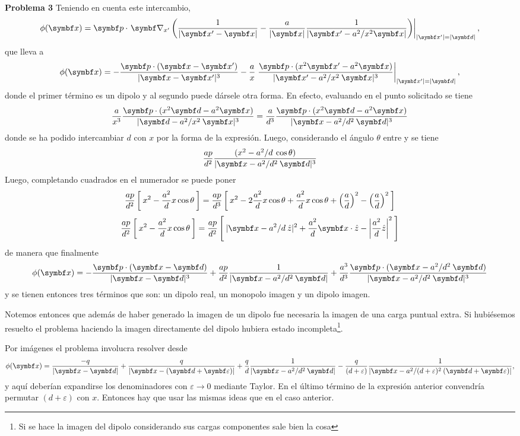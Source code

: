 \documentclass[10pt,oneside]{CBFT_book}
\begin{document}
\begin{ejemplo}{\bf Problema 3}
Teniendo en cuenta este intercambio,
\[
	\phi(\vbx) =  \vb{p} \cdot \left. \Nabla_{x'} \left( 
	\frac{1}{|\vbx'-\vbx|} - \frac{a}{|\vbx|}\frac{1}{|\vbx' - a^2/x^2 \vbx|}
	\right) \right|_{|\vbx'|=|\vb{d}|},
\]
que lleva a 
\[
	\phi(\vbx) = - \frac{\vb{p}\cdot(\vbx-\vbx')}{|\vbx-\vbx'|^3} 
	- \frac{a}{x} \left. \frac{ \vb{p} \cdot ( x^2 \vbx' - a^2 \vb{x} )}{|\vbx' - a^2/x^2 \: \vbx|^3}
	\right|_{|\vbx'|=|\vb{d}|},
\]
donde el primer término es un dipolo y al segundo puede dársele otra forma. En efecto, evaluando
en el punto solicitado se tiene
\[
	\frac{a}{x^3} \frac{ \vb{p} \cdot ( x^2 \vb{d} - a^2 \vb{x} )}{|\vb{d} - a^2/x^2 \: \vbx|^3} = 
	\frac{a}{d^3} \frac{ \vb{p} \cdot ( x^2 \vb{d} - a^2 \vb{x} )}{|\vbx - a^2/d^2 \: \vb{d}|^3}
\]
donde se ha podido intercambiar $d$ con $x$ por la forma de la expresión. Luego, considerando
el ángulo $\theta$ entre  y  se tiene
\[
	\frac{ap}{d^2} \frac{( x^2 - a^2 /d \: \cos\theta)}{|\vbx - a^2/d^2 \: \vb{d}|^3}
\]
Luego, completando cuadrados en el numerador se puede poner
\[
	\frac{ap}{d^2}\left[\: x^2 - \frac{a^2}{d} x \cos\theta \:\right] =
	\frac{ap}{d^3}\left[\: x^2 - 2 \frac{a^2}{d} x \cos\theta + \frac{a^2}{d} x \cos\theta 
	+ \left( \frac{ a }{ d } \right)^2 - \left( \frac{ a }{ d } \right)^2 \:\right]
\]
\[
	\frac{ap}{d^2}\left[\: x^2 - \frac{a^2}{d} x \cos\theta \:\right] =
	\frac{ap}{d^2}\left[\: |\vbx - a^2/d \: \hat{z}|^2 + \frac{a^2}{d}\vbx\cdot\hat{z} - 
	\left| \frac{a^2}{d} \hat{z} \right|^2 \:\right]
\]
de manera que finalmente
\[
	\phi(\vbx) =  - \frac{\vb{p}\cdot(\vbx-\vb{d})}{|\vbx-\vb{d}|^3} +
	\frac{ap}{d^2} \frac{1}{|\vbx - a^2/d^2 \: \vb{d}|}+
	\frac{a^3}{d^3} \frac{\vb{p}\cdot(\vbx- a^2/d^2 \: \vb{d})}{|\vbx - a^2/d^2 \: \vb{d}|^3}
\]
y se tienen entonces tres términos que son: un dipolo real, un monopolo imagen y un dipolo imagen.

Notemos entonces que además de haber generado la imagen de un dipolo fue necesaria la imagen de una carga
puntual extra. Si hubiésemos resuelto el problema haciendo la imagen directamente del dipolo hubiera
estado incompleta\footnote{Si se hace la imagen del dipolo considerando sus cargas componentes sale
bien la cosa}.

Por imágenes el problema involucra resolver desde
\[
	\phi(\vbx) = \frac{-q}{|\vbx -\vb{d} |} + \frac{q}{|\vbx -(\vb{d} + \vb{\varepsilon}) |} + 
	\frac{q}{d}\frac{1}{|\vbx - a^2/d^2 \: \vb{d} |} 
	- \frac{q}{(d+\varepsilon)}\frac{1}{|\vbx - a^2/(d+\varepsilon)^2 \: (\vb{d} + \vb{\varepsilon}) |},
\]
y aquí deberían expandirse los denominadores con $\varepsilon\to 0$ mediante Taylor.
En el último término de la expresión anterior convendría permutar $(d+\varepsilon)$ con $x$.
Entonces hay que usar las mismas ideas que en el caso anterior.


\end{ejemplo}
\end{document}
